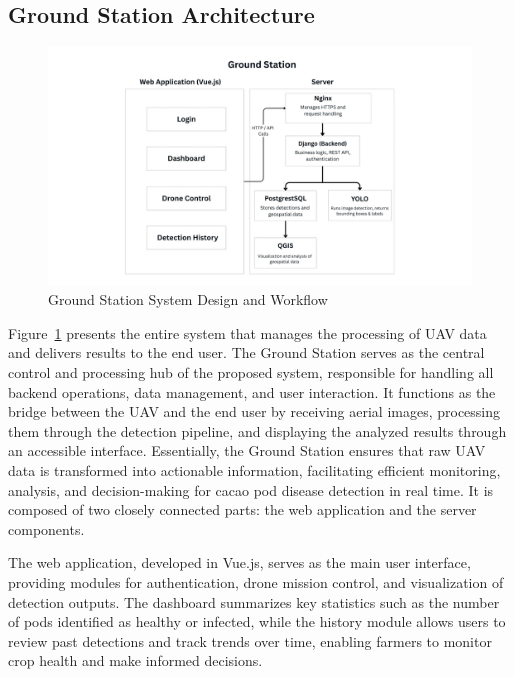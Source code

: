 \subsection{Ground Station Architecture}

\begin{figure}[H]
	\centering
	\caption{Ground Station System Design and Workflow}
	\label{fig:GroundStation}
	\includegraphics[width=1\textwidth]{figures/Ground_Station.pdf}
\end{figure}

Figure~\ref{fig:GroundStation} presents the entire system that manages the processing of UAV data and delivers results to the end user. The Ground Station serves as the central control and processing hub of the proposed system, responsible for handling all backend operations, data management, and user interaction. It functions as the bridge between the UAV and the end user by receiving aerial images, processing them through the detection pipeline, and displaying the analyzed results through an accessible interface. Essentially, the Ground Station ensures that raw UAV data is transformed into actionable information, facilitating efficient monitoring, analysis, and decision-making for cacao pod disease detection in real time. It is composed of two closely connected parts: the web application and the server components.

The web application, developed in Vue.js, serves as the main user interface, providing modules for authentication, drone mission control, and visualization of detection outputs. The dashboard summarizes key statistics such as the number of pods identified as healthy or infected, while the history module allows users to review past detections and track trends over time, enabling farmers to monitor crop health and make informed decisions.


